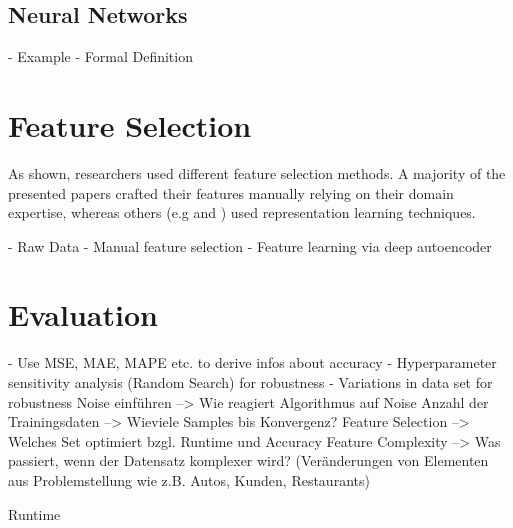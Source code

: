  


\subsection{Neural Networks}
- Example
- Formal Definition

\section{Feature Selection}

As shown, researchers used different feature selection methods. A majority of the presented papers crafted their features manually relying on their domain expertise, whereas others (e.g \cite{Siripanpornchana2016_AnnWithDbnFS} and \cite{Huang2018_GBDT}) used representation learning techniques.


- Raw Data 
- Manual feature selection
- Feature learning via deep autoencoder

\section{Evaluation} 
- Use MSE, MAE, MAPE etc. to derive infos about accuracy
- Hyperparameter sensitivity analysis (Random Search) for robustness
- Variations in data set for robustness
Noise einführen 
--> Wie reagiert Algorithmus auf Noise
Anzahl der Trainingsdaten 
--> Wieviele Samples bis Konvergenz?
Feature Selection
--> Welches Set optimiert bzgl. Runtime und Accuracy
Feature Complexity
--> Was passiert, wenn der Datensatz komplexer wird? (Veränderungen von Elementen aus Problemstellung wie z.B. Autos, Kunden, Restaurants)

Runtime